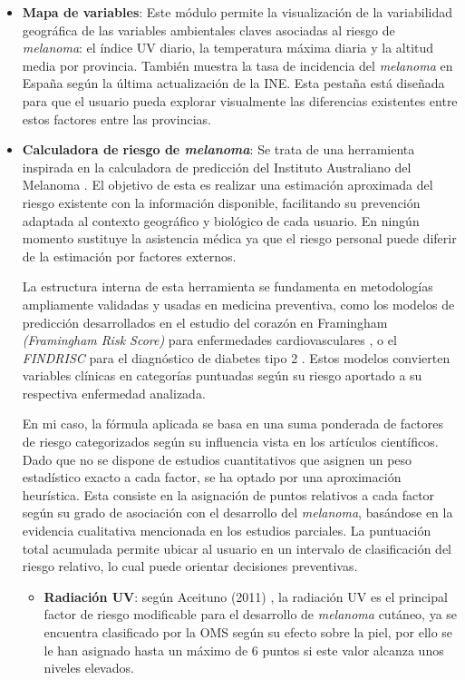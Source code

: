 \begin{itemize}
    \item  \textbf{Mapa de variables}: Este módulo permite la visualización de la variabilidad geográfica de las variables ambientales claves asociadas al riesgo de \textit{melanoma}: el índice UV diario, la temperatura máxima diaria y la altitud media por provincia. También muestra la tasa de incidencia del \textit{melanoma} en España según la última actualización de la INE. Esta pestaña está diseñada para que el usuario pueda explorar visualmente las diferencias existentes entre estos factores entre las provincias.
    
    \item \textbf{Calculadora de riesgo de \textit{melanoma}}: Se trata de una  herramienta inspirada en la calculadora de predicción del Instituto Australiano del Melanoma \cite{MelanomaRiskAssessment}. El objetivo de esta es realizar una estimación aproximada del riesgo existente con la información disponible, facilitando su prevención adaptada al contexto geográfico y biológico de cada usuario. En ningún momento sustituye la asistencia médica ya que el riesgo personal puede diferir de la estimación por factores externos.
    
    La estructura interna de esta herramienta se fundamenta en metodologías ampliamente validadas y usadas en medicina preventiva, como los modelos de predicción desarrollados en el estudio del corazón en Framingham \textit{(Framingham Risk Score)} para enfermedades cardiovasculares \cite{lloyd-jonesFraminghamRiskScore2004}, o el \textit{FINDRISC} para el diagnóstico de diabetes tipo 2 \cite{bernabe-ortizDiagnosticAccuracyFinnish2018}. Estos modelos convierten variables clínicas en categorías puntuadas según su riesgo aportado a su respectiva enfermedad analizada.
    
    En mi caso, la fórmula aplicada se basa en una suma ponderada de factores de riesgo categorizados según su influencia vista en los artículos científicos. Dado que no se dispone de estudios cuantitativos que asignen un peso estadístico exacto a cada factor, se ha optado por una aproximación heurística. Esta consiste en la asignación de puntos relativos a cada factor según su grado de asociación con el desarrollo del \textit{melanoma}, basándose en la evidencia cualitativa mencionada en los estudios parciales. La puntuación total acumulada permite ubicar al usuario en un intervalo de clasificación del riesgo relativo, lo cual puede orientar decisiones preventivas.
    \begin{itemize}
    \item \textbf{Radiación UV}: según Aceituno (2011) \cite{aceituno-maderaMelanomaAltitudeUVB2011}, la radiación UV es el principal factor de riesgo modificable para el desarrollo de \textit{melanoma} cutáneo, ya se encuentra clasificado por la OMS \cite{rehfuessGlobalSolarUV2002} según su efecto sobre la piel, por ello se le han asignado hasta un máximo de 6 puntos si este valor alcanza unos niveles elevados.
    

\end{itemize}
\end{itemize}
